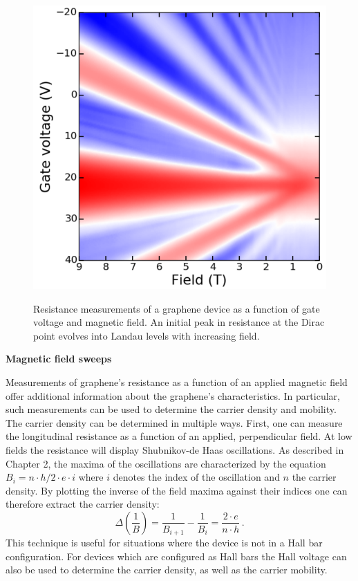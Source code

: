 \documentclass[edeposit,fullpage,draftthesis]{uiucthesis2009}
\begin{document}
            \begin{figure}
                \centering
                \includegraphics[width=0.4\linewidth]{images/experimentaltechniques/landau_levels.png}\\
                \caption[Landau levels in graphene]{
                    Resistance measurements of a graphene device as a function of gate voltage and
                    magnetic field. An initial peak in resistance at the Dirac point evolves into
                    Landau levels with increasing field.
                    }
                \label{fig:landau_levels}
            \end{figure}
            
            \textbf{Magnetic field sweeps}
            
            Measurements of graphene's resistance as a function of an applied magnetic field offer
            additional information about the graphene's characteristics. In particular, such measurements
            can be used to determine the carrier density and mobility.
            The carrier density can be determined in multiple ways. First, one can measure the
            longitudinal resistance as a function of an applied, perpendicular field. At low fields
            the resistance will display Shubnikov-de Haas oscillations. As described in Chapter 2, the 
            maxima of the oscillations are characterized by the equation $B_i = n \cdot h / 2 \cdot e \cdot i$
            where $i$ denotes the index of the oscillation and $n$ the carrier density. 
            By plotting the inverse of the field maxima against their indices one can therefore extract the carrier density:
            \begin{equation}
                \Delta\left(\frac{1}{B}\right) = \frac{1}{B_{i+1}}-\frac{1}{B_i} = \frac{2 \cdot e}{n\cdot h}\,.
            \end{equation}
            This technique is useful for situations where the device is not in a Hall bar configuration. For
            devices which are configured as Hall bars the Hall voltage can also be used to determine the carrier
            density, as well as the carrier mobility.
            
\end{document}
